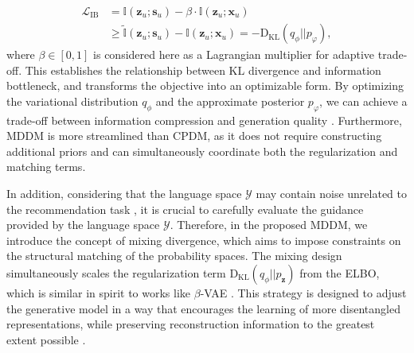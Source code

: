 \documentclass[sigconf]{acmart}
\begin{document}
\begin{align}
\label{ib}
\mathcal L_{\text{IB}}&=\mathbb I(\mathbf z_u; \mathbf s_u) - \beta \cdot \mathbb I(\mathbf z_u; \mathbf x_u) \nonumber\\
&\ge \tilde{\mathbb I} (\mathbf z_u; \mathbf s_u) - \mathbb I(\mathbf z_u; \mathbf x_u)=-\text{D}_{\text{KL}}(q_\phi||p_{\varphi}),
\end{align}
where $\beta \in [0, 1]$ is considered here as a Lagrangian multiplier for adaptive trade-off. This establishes the relationship between KL divergence and information bottleneck, and transforms the objective into an optimizable form. By optimizing the variational distribution $q_\phi$ and the approximate posterior $p_\varphi$, we can achieve a trade-off between information compression and generation quality \cite{salah2021towards, truong2021bilateral}. Furthermore, MDDM is more streamlined than CPDM, as it does not require constructing additional priors and can simultaneously coordinate both the regularization and matching terms.

In addition, considering that the language space $\mathcal Y$ may contain noise unrelated to the recommendation task \cite{ren2024representation}, it is crucial to carefully evaluate the guidance provided by the language space $\mathcal Y$. Therefore, in the proposed MDDM, we introduce the concept of mixing divergence, which aims to impose constraints on the structural matching of the probability spaces. The mixing design simultaneously scales the regularization term $\text{D}_{\text{KL}}(q_\phi||p_{\mathbf z})$ from the ELBO, which is similar in spirit to works like $\beta$-VAE \cite{higgins2017beta}. This strategy is designed to adjust the generative model in a way that encourages the learning of more disentangled representations, while preserving reconstruction information to the greatest extent possible \cite{liang2018variational}.
\end{document}
